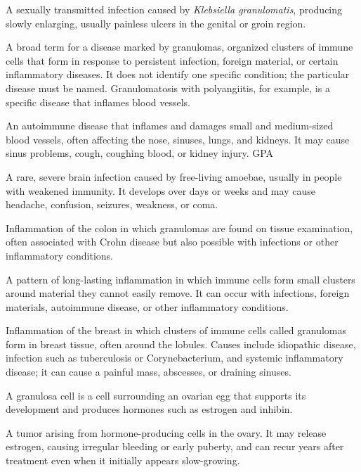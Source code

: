  A sexually transmitted infection caused by \textit{Klebsiella granulomatis}, producing slowly enlarging, usually painless ulcers in the genital or groin region.

 A broad term for a disease marked by granulomas, organized clusters of immune cells that form in response to persistent infection, foreign material, or certain inflammatory diseases. It does not identify one specific condition; the particular disease must be named. Granulomatosis with polyangiitis, for example, is a specific disease that inflames blood vessels.

 An autoimmune disease that inflames and damages small and medium-sized blood vessels, often affecting the nose, sinuses, lungs, and kidneys. It may cause sinus problems, cough, coughing blood, or kidney injury.
\synonyms
GPA

 A rare, severe brain infection caused by free-living amoebae, usually in people with weakened immunity. It develops over days or weeks and may cause headache, confusion, seizures, weakness, or coma.

 Inflammation of the colon in which granulomas are found on tissue examination, often associated with Crohn disease but also possible with infections or other inflammatory conditions.

 A pattern of long-lasting inflammation in which immune cells form small clusters around material they cannot easily remove. It can occur with infections, foreign materials, autoimmune disease, or other inflammatory conditions.

 Inflammation of the breast in which clusters of immune cells called granulomas form in breast tissue, often around the lobules. Causes include idiopathic disease, infection such as tuberculosis or Corynebacterium, and systemic inflammatory disease; it can cause a painful mass, abscesses, or draining sinuses.

 A granulosa cell is a cell surrounding an ovarian egg that supports its development and produces hormones such as estrogen and inhibin.

 A tumor arising from hormone-producing cells in the ovary. It may release estrogen, causing irregular bleeding or early puberty, and can recur years after treatment even when it initially appears slow-growing.

